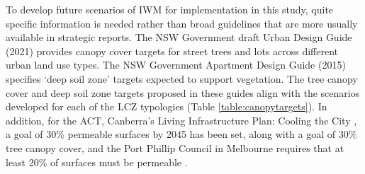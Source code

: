 \documentclass[utf8]{frontiersSCNS} %
\begin{document}
To develop future scenarios of IWM for implementation in this study, quite specific information is needed rather than broad guidelines that are more usually available in strategic reports. The NSW Government draft Urban Design Guide (2021) \citep{NewSouthWales2021} provides canopy cover targets for street trees and lots across different urban land use types. The NSW Government Apartment Design Guide (2015) \citep{NSW2015} specifies `deep soil zone' targets expected to support vegetation. The tree canopy cover and deep soil zone targets proposed in these guides align with the scenarios developed for each of the LCZ typologies (Table \ref{table:canopytargets}). In addition, for the ACT, Canberra's Living Infrastructure Plan: Cooling the City \citep{ACTGovernment2019}, a goal of 30\% permeable surfaces by 2045 has been set, along with a goal of 30\% tree canopy cover, and the Port Phillip Council in Melbourne requires that at least 20\% of surfaces must be permeable \citep{CityofPortPhillip2018}.
\end{document}
